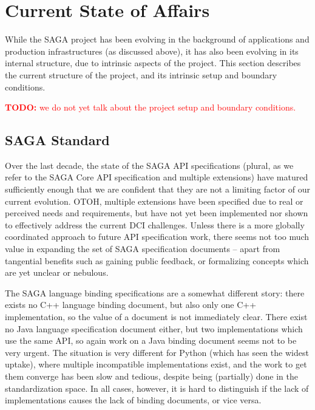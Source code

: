 \documentclass[]{article}
\newcommand{\B}[1]{\textbf{#1}}
\newcommand{\todo}[1]{{\textcolor{red}{\B{TODO:} #1 }}}
\begin{document}
%


\section{Current State of Affairs}
\label{sec:state}


 While the SAGA project has been evolving in the background of
 applications and production infrastructures (as discussed above), it
 has also been evolving in its internal structure, due to intrinsic
 aspects of the project.  This section describes the current structure
 of the project, and its intrinsic setup and boundary conditions.

 \todo{we do not yet talk about the project setup and boundary
 conditions.}


\subsection{SAGA Standard}

  Over the last decade, the state of the SAGA API specifications
  (plural, as we refer to the SAGA Core API specification and multiple
  extensions) have matured sufficiently enough that we are confident
  that they are not a limiting factor of our current evolution.  OTOH,
  multiple extensions have been specified due to real or perceived
  needs and requirements, but have not yet been implemented nor shown
  to effectively address the current DCI challenges.  Unless there is
  a more globally coordinated approach to future API specification
  work, there seems not too much value in expanding the set of SAGA
  specification documents -- apart from tangential benefits such as
  gaining public feedback, or formalizing concepts which are yet
  unclear or nebulous.

  The SAGA language binding specifications are a somewhat different
  story: there exists no C++ language binding document, but also only
  one C++ implementation, so the value of a document is not
  immediately clear.  There exist no Java language specification
  document either, but two implementations which use the same API, so 
  again work on a Java binding document seems not to be very urgent.  
  The situation is very different for Python (which has seen the widest 
  uptake), where multiple incompatible implementations exist, and the 
  work to get them converge has been slow and tedious, despite being 
  (partially) done in the standardization space.  In all cases, however, 
  it is hard to distinguish if the lack of implementations causes the 
  lack of binding documents, or vice versa.
  
\end{document}
